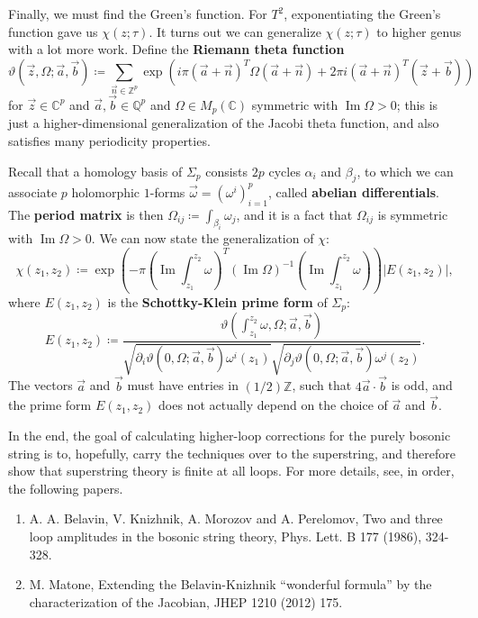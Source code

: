 \documentclass{report}
\theoremstyle{plain}
\theoremstyle{definition}
\theoremstyle{remark}
\newcommand{\di}{\partial}
\newcommand{\bC}{\mathbb{C}}
\newcommand{\bZ}{\mathbb{Z}}
\newcommand{\bQ}{\mathbb{Q}}
\DeclareMathOperator{\im}{Im}
\begin{document}
Finally, we must find the Green's function. For $T^2$, exponentiating
the Green's function gave us $\chi(z; \tau)$. It turns out we can
generalize $\chi(z; \tau)$ to higher genus with a lot more work.
Define the {\bf Riemann theta function}
\[ \vartheta(\vec{z}, \Omega; \vec{a}, \vec{b}) \coloneqq \sum_{\vec{n} \in \bZ^p} \exp\left(i\pi(\vec{a} + \vec{n})^T\Omega(\vec{a} + \vec{n}) + 2\pi i(\vec{a} + \vec{n})^T(\vec{z} + \vec{b})\right) \]
for $\vec{z} \in \bC^p$ and $\vec{a}, \vec{b} \in \bQ^p$ and $\Omega
\in M_p(\bC)$ symmetric with $\im \Omega > 0$; this is just a
higher-dimensional generalization of the Jacobi theta function, and
also satisfies many periodicity properties.

Recall that a homology basis of $\Sigma_p$ consists $2p$ cycles
$\alpha_i$ and $\beta_j$, to which we can associate $p$ holomorphic
$1$-forms $\vec{\omega} = (\omega^i)_{i=1}^p$, called {\bf abelian
  differentials}. The {\bf period matrix} is then $\Omega_{ij}
\coloneqq \int_{\beta_i} \omega_j$, and it is a fact that
$\Omega_{ij}$ is symmetric with $\im \Omega > 0$. We can now state the
generalization of $\chi$:
\[ \chi(z_1, z_2) \coloneqq \exp\left(-\pi \left(\im \int_{z_1}^{z_2} \omega\right)^T (\im \Omega)^{-1} \left(\im \int_{z_1}^{z_2} \omega\right)\right) |E(z_1, z_2)|, \]
where $E(z_1, z_2)$ is the {\bf Schottky-Klein prime form} of
$\Sigma_p$:
\[ E(z_1, z_2) \coloneqq \frac{\vartheta\left(\int_{z_1}^{z_2} \omega, \Omega; \vec{a}, \vec{b}\right)}{\sqrt{\di_i\vartheta(0, \Omega; \vec{a}, \vec{b}) \omega^i(z_1)}\sqrt{\di_j\vartheta(0, \Omega; \vec{a}, \vec{b}) \omega^j(z_2)}}. \]
The vectors $\vec{a}$ and $\vec{b}$ must have entries in $(1/2)\bZ$,
such that $4\vec{a} \cdot \vec{b}$ is odd, and the prime form $E(z_1,
z_2)$ does not actually depend on the choice of $\vec{a}$ and
$\vec{b}$.

In the end, the goal of calculating higher-loop corrections for the
purely bosonic string is to, hopefully, carry the techniques over to
the superstring, and therefore show that superstring theory is finite
at all loops. For more details, see, in order, the following papers.
\begin{enumerate}
\item A. A. Belavin, V. Knizhnik, A. Morozov and A. Perelomov, Two and
  three loop amplitudes in the bosonic string theory, Phys. Lett. B
  177 (1986), 324-328.
\item M. Matone, Extending the Belavin-Knizhnik ``wonderful formula''
  by the characterization of the Jacobian, JHEP 1210 (2012) 175.
\end{enumerate}
\end{document}

